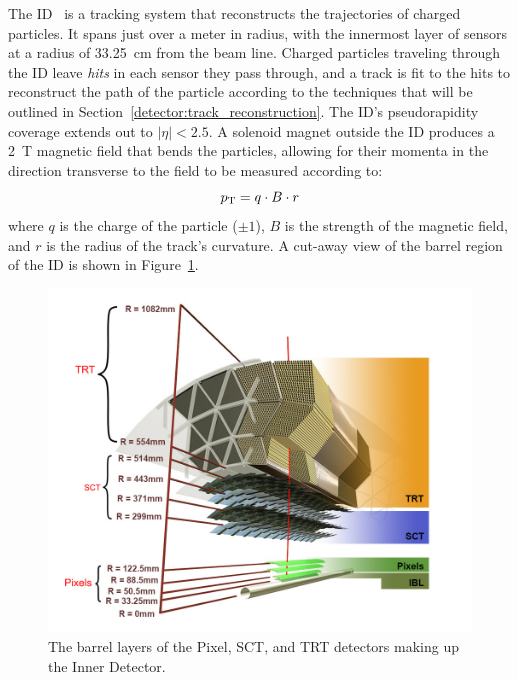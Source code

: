 ﻿The ID~\cite{1997.id-tdr-1, 1997.id-tdr-2} is a tracking system that reconstructs the trajectories of charged particles.
It spans just over a meter in radius, with the innermost layer of sensors at a radius of 33.25~cm from the beam line.
Charged particles traveling through the ID leave \emph{hits} in each sensor they pass through, and a track is fit to the hits to reconstruct the path of the particle according to the techniques that will be outlined in Section~\ref{detector:track_reconstruction}.
The ID's pseudorapidity coverage extends out to $|\eta| < 2.5$.
A solenoid magnet outside the ID produces a 2~T magnetic field that bends the particles, allowing for their momenta in the direction transverse to the field to be measured according to:
\begin{equation}
  \pt = q\cdot B\cdot r
  \label{eq:id_pt}
\end{equation}
where $q$ is the charge of the particle ($\pm 1$), $B$ is the strength of the magnetic field, and $r$ is the radius of the track's curvature.
A cut-away view of the barrel region of the ID is shown in Figure~\ref{fig:detector_ID}.

\begin{figure}
  \centering
  \includegraphics[width=.8\textwidth]{figs/detector/ID}
  \caption{The barrel layers of the Pixel, SCT, and TRT detectors making up the Inner Detector.}
  \label{fig:detector_ID}
\end{figure}

